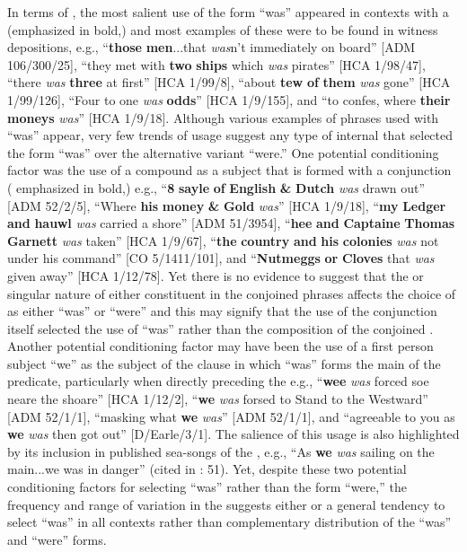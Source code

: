 In terms of , the most salient use of the  form “was” appeared in   contexts with a  (emphasized in bold,) and most examples of these were to be found in witness depositions, e.g., “\textbf{those} \textbf{men}...that \textit{was}n't immediately on board” [ADM 106/300/25], “they met with \textbf{two} \textbf{ships} which \textit{was} pirates” [HCA 1/98/47], “there \textit{was} \textbf{three} at first” [HCA 1/99/8], “about \textbf{tew} \textbf{of} \textbf{them} \textit{was} gone” [HCA 1/99/126], “Four to one \textit{was} \textbf{odds}” [HCA 1/9/155], and “to confes, where \textbf{their} \textbf{moneys} \textit{was}” [HCA 1/9/18]. Although various examples of    phrases used with “was” appear, very few trends of usage suggest any type of internal  that selected the  form “was” over the alternative variant “were.”  One potential conditioning factor was the use of a compound  as a subject that is formed with a conjunction ( emphasized in bold,) e.g., “\textbf{8} \textbf{sayle} \textbf{of} \textbf{English} \textbf{\&}  \textbf{Dutch} \textit{was} drawn out” [ADM 52/2/5], “Where \textbf{his} \textbf{money} \textbf{\&}  \textbf{Gold} \textit{was}” [HCA 1/9/18], “\textbf{my} \textbf{Ledger} \textbf{and} \textbf{hauwl} \textit{was} carried a shore” [ADM 51/3954], “\textbf{hee} \textbf{and} \textbf{Captaine} \textbf{Thomas} \textbf{Garnett} \textit{was} taken” [HCA 1/9/67], “\textbf{the} \textbf{country} \textbf{and} \textbf{his} \textbf{colonies} \textit{was} not under his command” [CO 5/1411/101], and “\textbf{Nutmeggs} \textbf{or} \textbf{Cloves} that \textit{was} given away” [HCA 1/12/78]. Yet there is no evidence to suggest that the  or singular nature of either constituent in the conjoined  phrases affects the choice of   as either “was” or “were” and this may signify that the use of the conjunction itself selected the use of “was” rather than the composition of the conjoined . Another potential conditioning factor may have been the use of a first person   subject “we” as the subject of the clause in which “was” forms the main  of the predicate, particularly when directly preceding the  e.g., “\textbf{wee} \textit{was} forced soe neare the shoare” [HCA 1/12/2], “\textbf{we} \textit{was} forsed to Stand to the Westward” [ADM 52/1/1], “masking what \textbf{we} \textit{was}” [ADM 52/1/1], and “agreeable to you as \textbf{we} \textit{was} then got out” [D/Earle/3/1]. The salience of this usage is also highlighted by its inclusion in published sea-songs of the , e.g., “As \textbf{we} \textit{was} sailing on the main...we was in danger” (cited in \citealt{Palmer1986}: 51). Yet, despite these two potential conditioning factors for selecting “was” rather than the  form “were,” the frequency and range of variation in the  suggests either  or a general tendency to select “was” in all contexts rather than complementary distribution of the “was” and “were” forms. 

